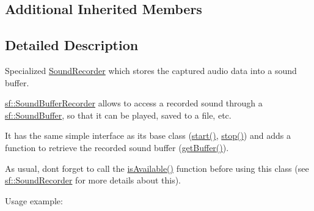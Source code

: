 \subsection*{Additional Inherited Members}


\subsection{Detailed Description}
Specialized \mbox{\hyperlink{classsf_1_1_sound_recorder}{Sound\+Recorder}} which stores the captured audio data into a sound buffer. 

\begin{DoxyVerb}\end{DoxyVerb}


\mbox{\hyperlink{classsf_1_1_sound_buffer_recorder}{sf\+::\+Sound\+Buffer\+Recorder}} allows to access a recorded sound through a \mbox{\hyperlink{classsf_1_1_sound_buffer}{sf\+::\+Sound\+Buffer}}, so that it can be played, saved to a file, etc.

It has the same simple interface as its base class (\mbox{\hyperlink{classsf_1_1_sound_recorder_a715f0fd2f228c83d79aaedca562ae51f}{start()}}, \mbox{\hyperlink{classsf_1_1_sound_recorder_a8d9c8346aa9aa409cfed4a1101159c4c}{stop()}}) and adds a function to retrieve the recorded sound buffer (\mbox{\hyperlink{classsf_1_1_sound_buffer_recorder_aa3a8d7a612cb885ed2f58bb86aa24acb}{get\+Buffer()}}).

As usual, don\textquotesingle{}t forget to call the \mbox{\hyperlink{classsf_1_1_sound_recorder_aab2bd0fee9e48d6cfd449b1cb078ce5a}{is\+Available()}} function before using this class (see \mbox{\hyperlink{classsf_1_1_sound_recorder}{sf\+::\+Sound\+Recorder}} for more details about this).

Usage example\+: 
\begin{DoxyCode}{0}
\DoxyCodeLine{\{}
\DoxyCodeLine{    \textcolor{comment}{// Record some audio data}}
\DoxyCodeLine{}
\DoxyCodeLine{    \textcolor{comment}{// Get the buffer containing the captured audio data}}
\DoxyCodeLine{}
\DoxyCodeLine{    \textcolor{comment}{// Save it to a file (for example...)}}
\DoxyCodeLine{\}}
\end{DoxyCode}


